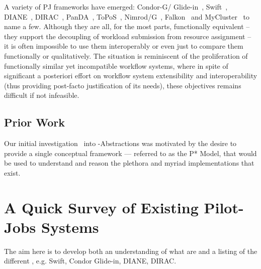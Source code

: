 \documentclass{sig-alternate}
\begin{document}
A variety of PJ frameworks have emerged: Condor-G/
Glide-in~\cite{condor-g}, Swift~\cite{Wilde2011},
DIANE~\cite{Moscicki:908910}, DIRAC~\cite{1742-6596-219-6-062049},
PanDA~\cite{1742-6596-219-6-062041}, ToPoS~\cite{topos},
Nimrod/G~\cite{10.1109/HPC.2000.846563}, Falkon~\cite{1362680} and
MyCluster~\cite{1652061} to name a few. Although they are all, for the
most parts, functionally equivalent -- they support the decoupling of
workload submission from resource assignment -- it is often impossible
to use them interoperably or even just to compare them functionally or
qualitatively.  The situation is reminiscent of the proliferation of
functionally similar yet incompatible workflow systems, where in spite
of significant a posteriori effort on workflow system extensibility
and interoperability (thus providing post-facto justification of its
needs), these objectives remains difficult if not infeasible.



\subsection{Prior Work}

Our initial investigation~\cite{Luckow:2008la} into
\pilot-Abstractions was motivated by the desire to provide a single
conceptual framework --- referred to as the P* Model, that would be
used to understand and reason the plethora and myriad \pilotjob
implementations that exist.



\section{A  Quick Survey of Existing Pilot-Jobs Systems}

The aim here is to develop both an understanding of what \pilotjobs
are and a listing of the different \pilotjobs, e.g. Swift, Condor
Glide-in, DIANE, DIRAC.

\end{document}
